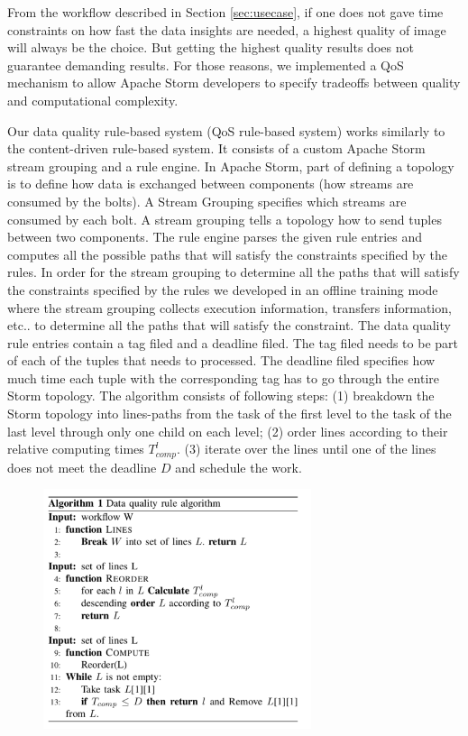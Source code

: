 From the workflow described in Section \ref{sec:usecase}, if one does not gave time constraints on how fast the data insights are needed, a highest quality of   image will always be the choice. But getting the highest quality results does not guarantee demanding results. For those reasons, we implemented a QoS mechanism to allow Apache Storm developers to specify tradeoffs between quality and computational complexity.

Our data quality rule-based system (QoS rule-based system) works similarly to the content-driven rule-based system. It consists of a custom Apache Storm stream grouping and a rule engine. In Apache Storm, part of defining a topology is to define how data is exchanged between components (how streams are consumed by the bolts). A Stream Grouping specifies which streams are consumed by each bolt. A stream grouping tells a topology how to send tuples between two components. The rule engine parses the given rule entries and computes all the possible paths that will satisfy the constraints specified by the rules. In order for the stream grouping to determine all the paths that will satisfy the constraints specified by the rules we developed in an offline training mode where the stream grouping collects execution information, transfers information, etc.. to determine all the paths that will satisfy the constraint. The data quality rule entries contain a tag filed and a deadline filed. The tag filed needs to be part of each of the tuples that needs to processed. The deadline filed specifies how much time each tuple with the corresponding tag has to go through the entire Storm topology. The algorithm consists of following steps: (1) breakdown the Storm topology into lines-paths from the task of the first level to the task of the last level through only one child on each level; (2) order lines according to their relative computing times $T_{comp}^l$. (3) iterate over the lines until one of the lines does not meet the deadline $D$ and schedule the work.

\begin{figure}[h!]
  \centering
  \includegraphics[width=0.7\textwidth]{Figures/Algorithm.pdf}
  \label{fig:boat1}
\end{figure}

